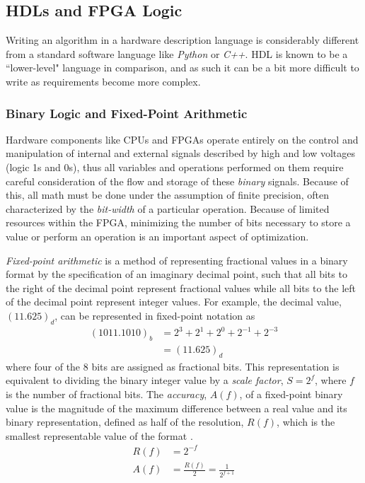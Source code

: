 \documentclass[reprint,amsmath,amssymb,aps,pra]{revtex4-2}
\begin{document}
\subsection{HDLs and FPGA Logic}
Writing an algorithm in a hardware description language is considerably different from a standard software language like \textit{Python} or \textit{C++}. HDL is known to be a ``lower-level" language in comparison, and as such it can be a bit more difficult to write as requirements become more complex.

\subsubsection{Binary Logic and Fixed-Point Arithmetic}
Hardware components like CPUs and FPGAs operate entirely on the control and manipulation of internal and external signals described by high and low voltages (logic 1s and 0s), thus all variables and operations performed on them require careful consideration of the flow and storage of these \textit{binary} signals. Because of this, all math must be done under the assumption of finite precision, often characterized by the \textit{bit-width} of a particular operation. Because of limited resources within the FPGA, minimizing the number of bits necessary to store a value or perform an operation is an important aspect of optimization.

\textit{Fixed-point arithmetic} is a method of representing fractional values in a binary format by the specification of an imaginary decimal point, such that all bits to the right of the decimal point represent fractional values while all bits to the left of the decimal point represent integer values. For example, the decimal value, $(11.625)_d$, can be represented in fixed-point notation as 
\begin{align*}
    (1011.1010)_b & = 2^3 + 2^1 + 2^0 + 2^{-1} + 2^{-3} \\
    & = (11.625)_d
\end{align*}
where four of the 8 bits are assigned as fractional bits. This representation is equivalent to dividing the binary integer value by a \textit{scale factor}, $S = 2^f$, where $f$ is the number of fractional bits. The \textit{accuracy}, $A(f)$, of a  fixed-point binary value is the magnitude of the maximum difference between a real value and its binary representation, defined as half of the resolution, $R(f)$, which is the smallest representable value of the format \cite{fixed-point}.
\begin{align}
    R(f) & = 2^{-f} \\
    A(f) & = \frac{R(f)}{2} = \frac{1}{2^{f+1}}
\end{align}
\end{document}
